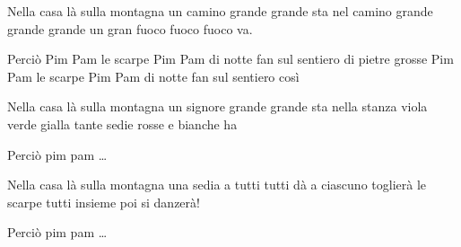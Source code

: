 
\beginverse

Nella casa là sulla montagna
un camino grande grande sta
nel camino grande grande grande
un gran fuoco fuoco fuoco va.

\endverse

\beginchorus

Perciò Pim Pam
le scarpe Pim Pam
di notte fan sul sentiero di pietre grosse Pim Pam
le scarpe Pim Pam di notte fan sul sentiero così

\endchorus

\chordsoff

\beginverse

Nella casa là sulla montagna
un signore grande grande sta
nella stanza viola verde gialla
tante sedie rosse e bianche ha

\endverse

\beginchorus

Perciò pim pam \dots

\endchorus

\beginverse

Nella casa là sulla montagna
una sedia a tutti tutti dà
a ciascuno toglierà le scarpe
tutti insieme poi si danzerà!

\endverse

\beginchorus

Perciò pim pam \dots

\endchorus

\endsong